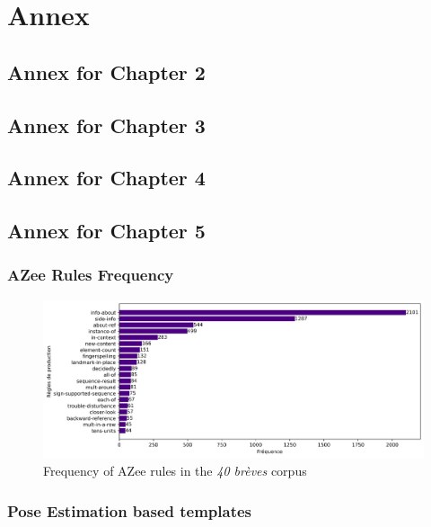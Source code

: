 \documentclass[../main.tex]{subfiles}
\begin{document}
\chapter{Annex}

\section{Annex for Chapter 2}
\label{app:background_work}

\section{Annex for Chapter 3}
\label{app:avatar_creation_pose_synthesis}

\section{Annex for Chapter 4}
\label{app:multi_track}

\section{Annex for Chapter 5}
\label{app:intermediate_blocks_pose_correction}

\subsection{AZee Rules Frequency}
\label{app:intermediate_blocks_pose_correction:azee_rules_frequency}

\begin{figure}[h]
    \centering
    \includegraphics[width=5in]{chapters/intermediate_blocks_pose_correction/images/azee_rule_frequency.png}
    \caption{Frequency of AZee rules in the \emph{40 brèves} corpus}
    \label{fig:azee_rule_frequency_ch1}
\end{figure}

\subsection{Pose Estimation based templates}
\label{app:intermediate_blocks_pose_correction:pose_est_templates}
\end{document}
